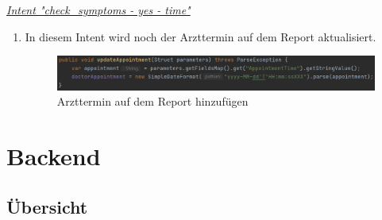 \documentclass[11pt,a4paper]{article}
\begin{document}
		\underline{\emph{Intent "check\_symptoms - yes - time"}} \\
		\begin{enumerate}
			\item In diesem Intent wird noch der Arzttermin auf dem Report aktualisiert.
			\begin{figure}[h!]
				\begin{center}
            		\includegraphics[width=1.0\linewidth]{JavaClient-UpdateAppointment.png}
					\caption{Arzttermin auf dem Report hinzufügen}
					\label{fig:javaClient_updateAppointment}
				\end{center}
			\end{figure}
		\end{enumerate}
	        
\newpage

\section{Backend}
    \subsection{Übersicht}
\end{document}
